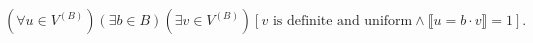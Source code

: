 $$(\forall u \in V^{(B)}) (\exists b \in B) (\exists v \in V^{(B)}) [v \text{ is definite and uniform} \land \llbracket u = b \cdot v \rrbracket = 1].$$
